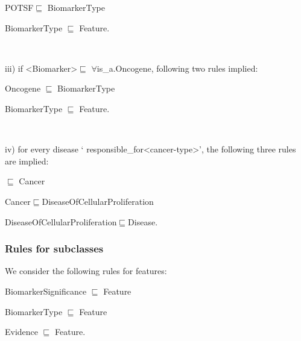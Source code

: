\vspace{-6mm}
\begin{itemize}[noitemsep]
\scriptsize{
    \item POTSF$\sqsubseteq$ BiomarkerType
    \item BiomarkerType $\sqsubseteq$ Feature.} \\
\end{itemize}

\vspace{-6mm}
\noindent iii) if <Biomarker>$\sqsubseteq$ $\forall$is\_a.Oncogene, following two rules implied:\\

\vspace{-6mm}
\begin{itemize}[noitemsep]
\scriptsize{
    \item Oncogene $\sqsubseteq$ BiomarkerType
    \item BiomarkerType $\sqsubseteq$ Feature.} \\
\end{itemize}

\vspace{-6mm}
\noindent iv) for every disease ` responsible\_for<cancer-type>', the following three rules are implied:\\

\vspace{-6mm}
\begin{itemize}[noitemsep]
\scriptsize{
    \item <cancer-type>$\sqsubseteq$ Cancer
    \item Cancer$\sqsubseteq$DiseaseOfCellularProliferation
    \item DiseaseOfCellularProliferation$\sqsubseteq$Disease.}
\end{itemize}
\vspace{-2mm}

\subsubsection{Rules for subclasses}
We consider the following rules for features:

\vspace{-2mm}
\begin{itemize}[noitemsep]
\scriptsize{
    \item BiomarkerSignificance $ \sqsubseteq $ Feature
    \item BiomarkerType $ \sqsubseteq $ Feature
    \item Evidence $ \sqsubseteq $ Feature.}
\end{itemize}
\vspace{-2mm}

